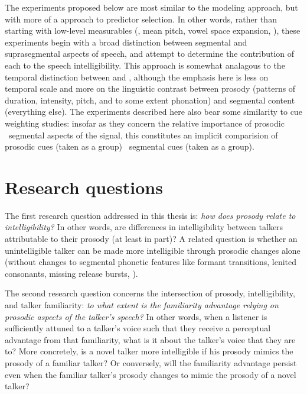 The experiments proposed below are most similar to the modeling approach, but with more of a  approach to predictor selection.  In other words, rather than starting with low-level measurables (\eg, mean pitch, vowel space expansion, \etc), these experiments begin with a broad distinction between segmental and suprasegmental aspects of speech, and attempt to determine the contribution of each to the speech intelligibility.  This approach is somewhat analagous to the temporal distinction between  and  \citep{Rosen1992}, although the emphasis here is less on temporal scale and more on the linguistic contrast between prosody (patterns of duration, intensity, pitch, and to some extent phonation) and segmental content (everything else).  The experiments described here also bear some similarity to cue weighting studies: insofar as they concern the relative importance of prosodic \vs\ segmental aspects of the signal, this constitutes an implicit comparision of prosodic cues (taken as a group) \vs\ segmental cues (taken as a group).

\section{Research questions}
The first research question addressed in this thesis is: {\em how does prosody relate to intelligibility?}  In other words, are differences in intelligibility between talkers attributable to their prosody (at least in part)?  A related question is whether an unintelligible talker can be made more intelligible through prosodic changes alone (without changes to segmental phonetic features like formant transitions, lenited consonants, missing release bursts, \etc).


The second research question concerns the intersection of prosody, intelligibility, and talker familiarity: {\em to what extent is the familiarity advantage relying on prosodic aspects of the talker’s speech?}  In other words, when a  listener is sufficiently attuned to a talker’s voice such that they receive a perceptual advantage from that familiarity, what is it about the talker’s voice that they are  to?  More concretely, is a novel talker more intelligible if his prosody mimics the prosody of a familiar talker?  Or conversely, will the familiarity advantage persist even when the familiar talker’s prosody changes to mimic the prosody of a novel talker?

